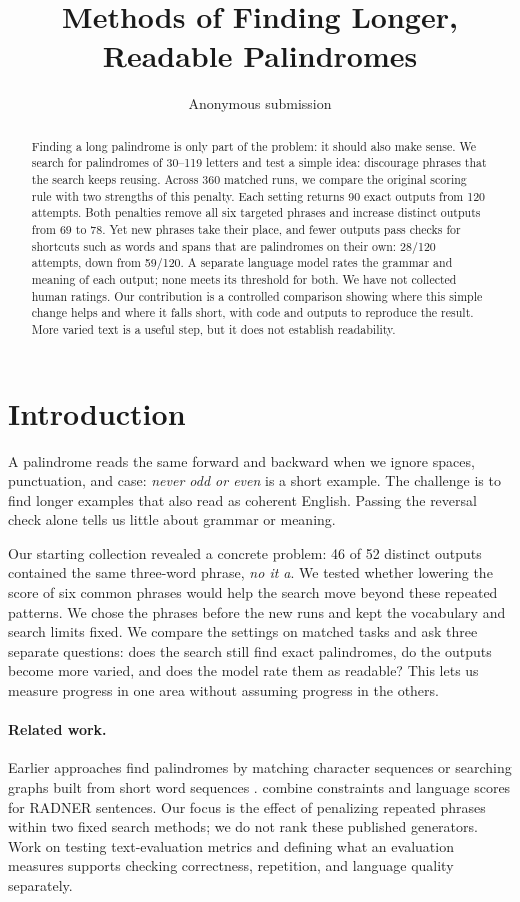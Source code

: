 \documentclass[11pt]{article}
\title{Methods of Finding Longer, Readable Palindromes}
\author{Anonymous submission}
\begin{document}
\maketitle

\begin{abstract}
Finding a long palindrome is only part of the problem: it should also make sense. We search for palindromes of 30--119 letters and test a simple idea: discourage phrases that the search keeps reusing. Across 360 matched runs, we compare the original scoring rule with two strengths of this penalty. Each setting returns 90 exact outputs from 120 attempts. Both penalties remove all six targeted phrases and increase distinct outputs from 69 to 78. Yet new phrases take their place, and fewer outputs pass checks for shortcuts such as words and spans that are palindromes on their own: 28/120 attempts, down from 59/120. A separate language model rates the grammar and meaning of each output; none meets its threshold for both. We have not collected human ratings. Our contribution is a controlled comparison showing where this simple change helps and where it falls short, with code and outputs to reproduce the result. More varied text is a useful step, but it does not establish readability.
\end{abstract}

\section{Introduction}
A palindrome reads the same forward and backward when we ignore spaces, punctuation, and case: \emph{never odd or even} is a short example. The challenge is to find longer examples that also read as coherent English. Passing the reversal check alone tells us little about grammar or meaning.

Our starting collection revealed a concrete problem: 46 of 52 distinct outputs contained the same three-word phrase, \emph{no it a}. We tested whether lowering the score of six common phrases would help the search move beyond these repeated patterns. We chose the phrases before the new runs and kept the vocabulary and search limits fixed. We compare the settings on matched tasks and ask three separate questions: does the search still find exact palindromes, do the outputs become more varied, and does the model rate them as readable? This lets us measure progress in one area without assuming progress in the others.

\paragraph{Related work.}
Earlier approaches find palindromes by matching character sequences \citep{norvig2002palindrome} or searching graphs built from short word sequences \citep{papadopoulos2015palindromes}. \citet{bonlarron-regin-2024} combine constraints and language scores for RADNER sentences. Our focus is the effect of penalizing repeated phrases within two fixed search methods; we do not rank these published generators. Work on testing text-evaluation metrics \citep{sai-etal-2021-perturbation} and defining what an evaluation measures \citep{howcroft-etal-2020-twenty} supports checking correctness, repetition, and language quality separately.
\end{document}
